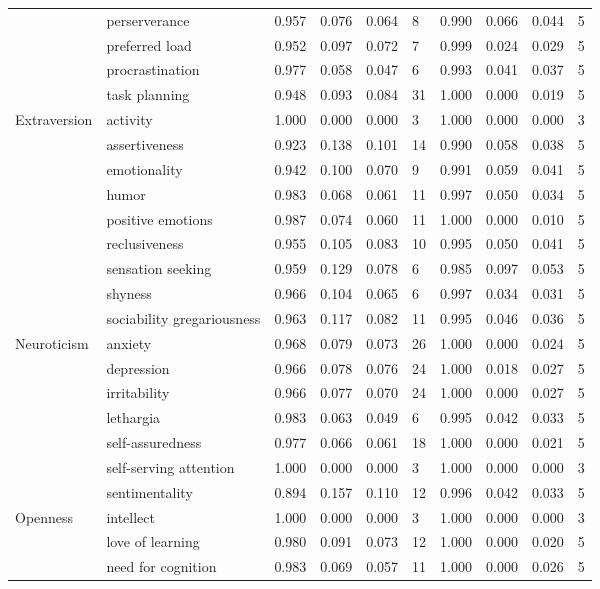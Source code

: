 \documentclass[man]{apa6}
\theoremstyle{definition}
\theoremstyle{definition}
\theoremstyle{definition}
\theoremstyle{remark}
\begin{document}
\begin{table}
{\begin{tabular}[t]{llllllllll}
 & perserverance & 0.957 & 0.076 & 0.064 & 8 & 0.990 & 0.066 & 0.044 & 5\\
 & preferred load & 0.952 & 0.097 & 0.072 & 7 & 0.999 & 0.024 & 0.029 & 5\\
 & procrastination & 0.977 & 0.058 & 0.047 & 6 & 0.993 & 0.041 & 0.037 & 5\\
 & task planning & 0.948 & 0.093 & 0.084 & 31 & 1.000 & 0.000 & 0.019 & 5\\
Extraversion & activity & 1.000 & 0.000 & 0.000 & 3 & 1.000 & 0.000 & 0.000 & 3\\
 & assertiveness & 0.923 & 0.138 & 0.101 & 14 & 0.990 & 0.058 & 0.038 & 5\\
 & emotionality & 0.942 & 0.100 & 0.070 & 9 & 0.991 & 0.059 & 0.041 & 5\\
 & humor & 0.983 & 0.068 & 0.061 & 11 & 0.997 & 0.050 & 0.034 & 5\\
 & positive emotions & 0.987 & 0.074 & 0.060 & 11 & 1.000 & 0.000 & 0.010 & 5\\
 & reclusiveness & 0.955 & 0.105 & 0.083 & 10 & 0.995 & 0.050 & 0.041 & 5\\
 & sensation seeking & 0.959 & 0.129 & 0.078 & 6 & 0.985 & 0.097 & 0.053 & 5\\
 & shyness & 0.966 & 0.104 & 0.065 & 6 & 0.997 & 0.034 & 0.031 & 5\\
 & sociability gregariousness & 0.963 & 0.117 & 0.082 & 11 & 0.995 & 0.046 & 0.036 & 5\\
Neuroticism & anxiety & 0.968 & 0.079 & 0.073 & 26 & 1.000 & 0.000 & 0.024 & 5\\
 & depression & 0.966 & 0.078 & 0.076 & 24 & 1.000 & 0.018 & 0.027 & 5\\
 & irritability & 0.966 & 0.077 & 0.070 & 24 & 1.000 & 0.000 & 0.027 & 5\\
 & lethargia & 0.983 & 0.063 & 0.049 & 6 & 0.995 & 0.042 & 0.033 & 5\\
 & self-assuredness & 0.977 & 0.066 & 0.061 & 18 & 1.000 & 0.000 & 0.021 & 5\\
 & self-serving attention & 1.000 & 0.000 & 0.000 & 3 & 1.000 & 0.000 & 0.000 & 3\\
 & sentimentality & 0.894 & 0.157 & 0.110 & 12 & 0.996 & 0.042 & 0.033 & 5\\
Openness & intellect & 1.000 & 0.000 & 0.000 & 3 & 1.000 & 0.000 & 0.000 & 3\\
 & love of learning & 0.980 & 0.091 & 0.073 & 12 & 1.000 & 0.000 & 0.020 & 5\\
 & need for cognition & 0.983 & 0.069 & 0.057 & 11 & 1.000 & 0.000 & 0.026 & 5\\

\end{tabular}}
\end{table}
\end{document}
